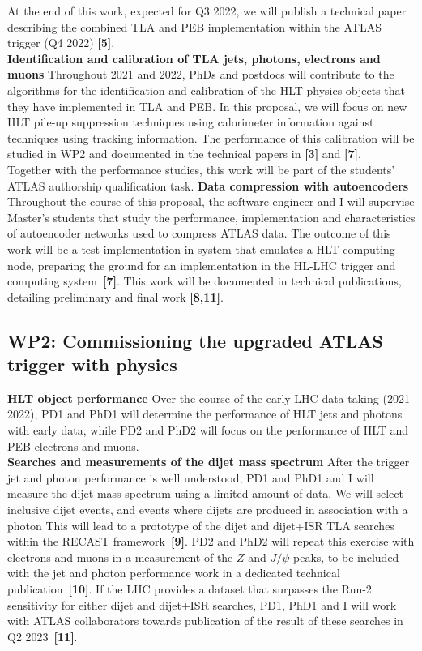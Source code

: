 At the end of this work, expected for Q3 2022, we will publish a technical paper describing the combined TLA and PEB implementation within the ATLAS trigger (Q4 2022) \textbf{[5]}. \\
\textbf{Identification and calibration of TLA jets, photons, electrons and muons} Throughout 2021 and 2022, PhDs and postdocs will contribute to the algorithms for the identification and calibration of the HLT physics objects that they have implemented in TLA and PEB. 
In this proposal, we will focus on new HLT pile-up suppression techniques using calorimeter information against techniques using tracking information. 
The performance of this calibration will be studied in WP2 and documented in the technical papers in \textbf{[3]} and \textbf{[7]}.\\
Together with the performance studies, this work will be part of the students' ATLAS authorship qualification task.
\textbf{Data compression with autoencoders} Throughout the course of this proposal, the software engineer and I will supervise Master's students that study the performance, implementation and characteristics of autoencoder networks used to compress ATLAS data. 
The outcome of this work will be a test implementation in system that emulates a HLT computing node, preparing the ground for an implementation in the HL-LHC trigger and computing system~\textbf{[7]}. 
This work will be documented in technical publications, detailing preliminary and final work \textbf{[8,11]}.

\subsection{WP2: Commissioning the upgraded ATLAS trigger with physics}

\textbf{HLT object performance} Over the course of the early LHC data taking (2021-2022), 
PD1 and PhD1 will determine the performance of HLT jets and photons with early data, while PD2 and PhD2 will focus on the performance of HLT and PEB electrons and muons. \\
\textbf{Searches and measurements of the dijet mass spectrum} After the trigger jet and photon performance is well understood, PD1 and PhD1 and I will measure the dijet mass spectrum using a limited amount of data. 
We will select inclusive dijet events, and events where dijets are produced in association with a photon
This will lead to a prototype of the dijet and dijet+ISR TLA searches within the RECAST framework~\textbf{[9]}.   
PD2 and PhD2 will repeat this exercise with electrons and muons in a measurement of the $Z$ and $J/\psi$ peaks, 
to be included with the jet and photon performance work in a dedicated technical publication~\textbf{[10]}. 
If the LHC provides a dataset that surpasses the Run-2 sensitivity for either dijet and dijet+ISR searches, 
PD1, PhD1 and I will work with ATLAS collaborators towards publication of the result of these searches in Q2 2023~\textbf{[11]}.

